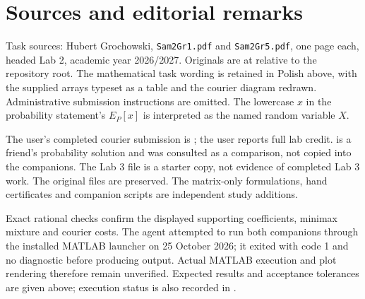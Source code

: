 \documentclass[11pt,a4paper]{article}
\begin{document}
\section{Sources and editorial remarks}
Task sources: Hubert Grochowski, \texttt{Sam2Gr1.pdf} and
\texttt{Sam2Gr5.pdf}, one page each, headed Lab 2, academic year 2026/2027.
Originals are at  relative to the repository root.
The mathematical task wording is retained in Polish above, with the supplied
arrays typeset as a table and the courier diagram redrawn. Administrative
submission instructions are omitted. The lowercase $x$ in the probability
statement's $E_P[x]$ is interpreted as the named random variable $X$.

The user's completed courier submission is
; the user reports full lab credit.
 is a friend's probability solution and was consulted
as a comparison, not copied into the companions. The Lab 3 file is a starter
copy, not evidence of completed Lab 3 work. The original files are preserved.
The matrix-only formulations, hand certificates and companion scripts are
independent study additions.

Exact rational checks confirm the displayed supporting coefficients, minimax
mixture and courier costs. The agent attempted to run both companions through
the installed MATLAB launcher on 25 October 2026; it exited with code 1 and
no diagnostic before producing output. Actual MATLAB execution and plot
rendering therefore remain unverified. Expected results and acceptance
tolerances are given above; execution status is also recorded in
.
\end{document}
